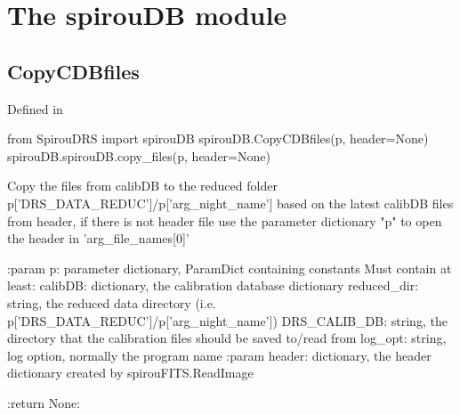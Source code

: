 
\clearpage
\newpage
\noindent\begin{minipage}{\textwidth}
\section{The spirouDB module}
\label{ch:the_module:spirouDB}

\subsection{CopyCDBfiles}

Defined in \spirouCDB{}

\begin{pythonbox}
from SpirouDRS import spirouDB
spirouDB.CopyCDBfiles(p, header=None)
spirouDB.spirouDB.copy_files(p, header=None)
\end{pythonbox}

\begin{pythondocstring}
Copy the files from calibDB to the reduced folder
   p['DRS_DATA_REDUC']/p['arg_night_name']
based on the latest calibDB files from header, if there is not header file
use the parameter dictionary "p" to open the header in 'arg_file_names[0]'

:param p: parameter dictionary, ParamDict containing constants
    Must contain at least:
            calibDB: dictionary, the calibration database dictionary
            reduced_dir: string, the reduced data directory
                         (i.e. p['DRS_DATA_REDUC']/p['arg_night_name'])
            DRS_CALIB_DB: string, the directory that the calibration
                          files should be saved to/read from
            log_opt: string, log option, normally the program name
:param header: dictionary, the header dictionary created by
               spirouFITS.ReadImage

:return None:
\end{pythondocstring}
\end{minipage}

